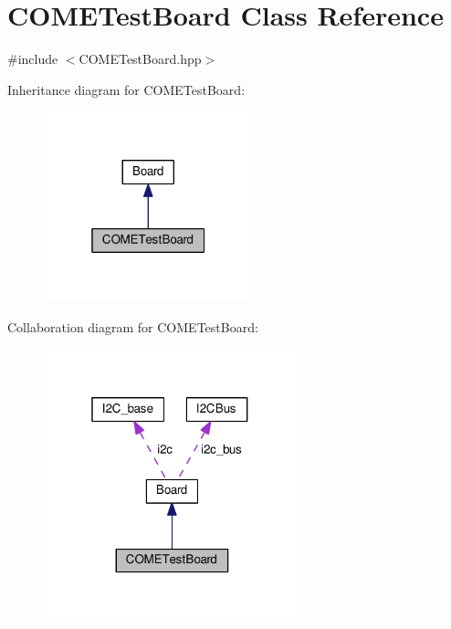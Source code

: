 \hypertarget{class_c_o_m_e_test_board}{}\section{C\+O\+M\+E\+Test\+Board Class Reference}
\label{class_c_o_m_e_test_board}


{\ttfamily \#include $<$C\+O\+M\+E\+Test\+Board.\+hpp$>$}



Inheritance diagram for C\+O\+M\+E\+Test\+Board\+:\nopagebreak
\begin{figure}[H]
\begin{center}
\leavevmode
\includegraphics[width=172pt]{class_c_o_m_e_test_board__inherit__graph}
\end{center}
\end{figure}


Collaboration diagram for C\+O\+M\+E\+Test\+Board\+:\nopagebreak
\begin{figure}[H]
\begin{center}
\leavevmode
\includegraphics[width=208pt]{class_c_o_m_e_test_board__coll__graph}
\end{center}
\end{figure}

